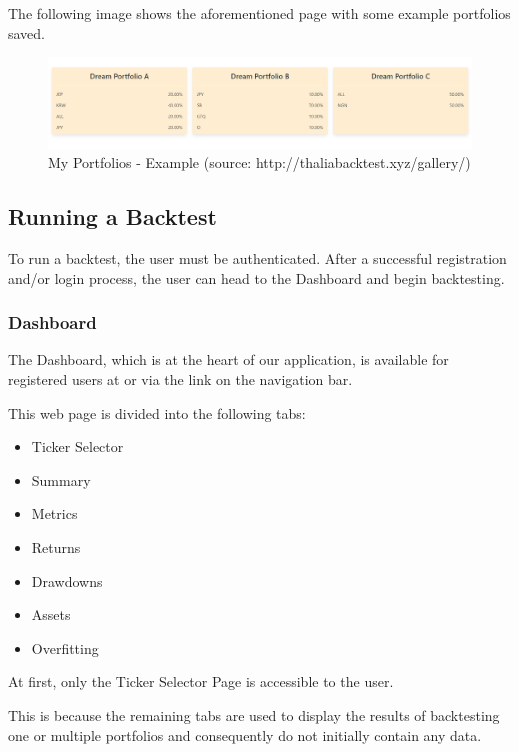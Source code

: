 \documentclass[main.tex]{subfiles}
\begin{document}
The following image shows the aforementioned page with some example portfolios saved.
\begin{figure}[H]
   \centering
   \includegraphics[width=\textwidth]{08Appendices/081User/081Pictures/my_portfolios.png}
   \caption{My Portfolios - Example (source: http://thaliabacktest.xyz/gallery/)}
\end{figure}

\subsection{Running a Backtest}

To run a backtest, the user must be authenticated. After a successful registration and/or login process, the user can head to the Dashboard and begin backtesting.

\subsubsection{Dashboard}

The Dashboard, which is at the heart of our application, is available for registered users at  or via the link on the navigation bar.

This web page is divided into the following tabs:

\begin{itemize}
    \item Ticker Selector
    \item Summary
    \item Metrics
    \item Returns 
    \item Drawdowns
    \item Assets
    \item Overfitting
\end{itemize}

At first, only the Ticker Selector Page is accessible to the user. 

This is because the remaining tabs are used to display the results of backtesting one or multiple portfolios and consequently do not initially contain any data.
\end{document}
